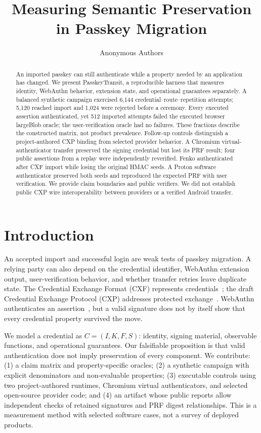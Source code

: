 \documentclass[letterpaper,twocolumn,10pt]{article}
\begin{document}
\date{}
\title{\Large \bf Measuring Semantic Preservation in Passkey Migration}
\author{Anonymous Authors}
\maketitle

\begin{abstract}
An imported passkey can still authenticate while a property needed by an
application has changed. We present PasskeyTransit, a reproducible harness
that measures identity, WebAuthn behavior, extension state, and operational
guarantees separately. A balanced synthetic campaign exercised 6,144
credential--route--repetition attempts; 5,120 reached import and 1,024 were rejected
before a ceremony. Every executed assertion authenticated, yet 512 imported
attempts failed the executed browser largeBlob oracle; the user-verification
oracle had no failures. These fractions describe the constructed matrix, not product
prevalence. Follow-up controls distinguish a project-authored CXP binding
from selected provider behavior. A Chromium virtual-authenticator transfer
preserved the signing credential but lost its PRF result; four public
assertions from a replay were independently reverified. Fenko authenticated
after CXF import while losing the original HMAC seeds. A Proton software
authenticator preserved both seeds and reproduced the expected PRF with user
verification. We provide claim boundaries and public verifiers. We did not
establish public CXP wire interoperability between providers or a verified
Android transfer.
\end{abstract}

\section{Introduction}
An accepted import and successful login are weak tests of passkey migration.
A relying party can also depend on the credential identifier, WebAuthn
extension output, user-verification behavior, and whether transfer retries
leave duplicate state. The Credential Exchange Format (CXF) represents
credentials~\cite{cxf}; the draft Credential Exchange Protocol (CXP)
addresses protected exchange~\cite{cxp}. WebAuthn authenticates an
assertion~\cite{webauthn}, but a valid signature does not by itself show
that every credential property survived the move.

We model a credential as $C=(I,K,F,S)$: identity, signing material,
observable functions, and operational guarantees. Our falsifiable
proposition is that valid authentication does not imply preservation of
every component. We contribute: (1) a claim matrix and property-specific
oracles; (2) a synthetic campaign with explicit denominators and
non-evaluable properties; (3) executable controls using two project-authored
runtimes, Chromium virtual authenticators, and selected open-source provider
code; and (4) an artifact whose public reports allow independent checks of
retained signatures and PRF digest relationships. This is a measurement
method with selected software cases, not a survey of deployed products.
\end{document}
